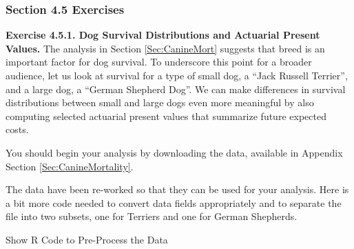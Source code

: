 \documentclass[
]{book}
\newenvironment{Shaded}{\begin{snugshade}}{\end{snugshade}}
\newcommand{\CommentTok}[1]{\textcolor[rgb]{0.56,0.35,0.01}{\textit{#1}}}
\newcommand{\DecValTok}[1]{\textcolor[rgb]{0.00,0.00,0.81}{#1}}
\newcommand{\FloatTok}[1]{\textcolor[rgb]{0.00,0.00,0.81}{#1}}
\newcommand{\KeywordTok}[1]{\textcolor[rgb]{0.13,0.29,0.53}{\textbf{#1}}}
\newcommand{\NormalTok}[1]{#1}
\newcommand{\OperatorTok}[1]{\textcolor[rgb]{0.81,0.36,0.00}{\textbf{#1}}}
\newcommand{\StringTok}[1]{\textcolor[rgb]{0.31,0.60,0.02}{#1}}
\begin{document}
\hypertarget{section-4.5-exercises}{%
\subsubsection*{Section 4.5 Exercises}\label{section-4.5-exercises}}

\textbf{Exercise 4.5.1. Dog Survival Distributions and Actuarial Present Values.} The analysis in Section \ref{Sec:CanineMort} suggests that breed is an important factor for dog survival. To underscore this point for a broader audience, let us look at survival for a type of small dog, a ``Jack Russell Terrier'', and a large dog, a ``German Shepherd Dog''. We can make differences in survival distributions between small and large dogs even more meaningful by also computing selected actuarial present values that summarize future expected costs.

You should begin your analysis by downloading the data, available in Appendix Section \ref{Sec:CanineMortality}.

The data have been re-worked so that they can be used for your analysis. Here is a bit more code needed to convert data fields appropriately and to separate the file into two subsets, one for Terriers and one for German Shepherds.

Show R Code to Pre-Process the Data

\hypertarget{toggleCode.Exer4.5.1A}{}
\begin{Shaded}
\end{Shaded}
\end{document}
